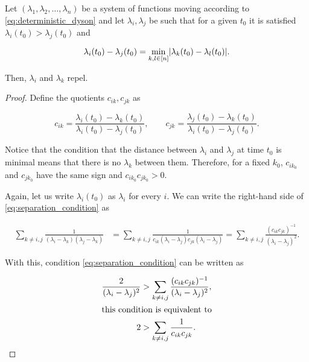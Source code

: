\begin{theorem} \label{thm:hermite_minimal_grows}
    Let $(\lambda_1, \lambda_2, \dots, \lambda_n)$ be a system of functions moving according to \eqref{eq:deterministic_dyson} and let $\lambda_i,\lambda_j$ be such that for a given $t_0$ it is satisfied $\lambda_i(t_0) > \lambda_j(t_0)$ and 
    
    \begin{equation*}
        \lambda_i(t_0) - \lambda_j(t_0) = \min_{k,l \in [n]} \lvert  \lambda_k(t_0) - \lambda_l(t_0) \rvert.
    \end{equation*}

    Then, $\lambda_i$ and $\lambda_k$ repel. 
\end{theorem}

\begin{proof}
    Define the quotients $c_{ik}, c_{jk}$ as 

    \begin{equation*}
        c_{ik} = \frac{\lambda_i(t_0) - \lambda_k(t_0)}{\lambda_i(t_0) - \lambda_j(t_0)}, \qquad c_{jk} = \frac{\lambda_j(t_0) - \lambda_k(t_0)}{\lambda_i(t_0) - \lambda_j(t_0)}.
    \end{equation*}

    Notice that the condition that the distance between $\lambda_i$ and $\lambda_j$ at time $t_0$ is minimal means that there is no $\lambda_k$ between them. Therefore, for a fixed $k_0$, $c_{ik_0}$ and $c_{jk_0}$ have the same sign and $c_{ik_0}c_{jk_0}>0$. 
    
    Again, let us write $\lambda_i(t_0)$ as $\lambda_i$ for every $i$. We can write the right-hand side of \eqref{eq:separation_condition} as

    \begin{align*}
        \sum_{k\neq i,j} \frac{1}{(\lambda_i - \lambda_k)(\lambda_j - \lambda_k)} &= \sum_{k\neq i,j} \frac{1}{ c_{ik}(\lambda_i - \lambda_j) c_{jk}(\lambda_i - \lambda_j)} = \sum_{k\neq i,j} \frac{ (c_{ik}c_{jk})^{-1} }{(\lambda_i-\lambda_j)^2}.
    \end{align*}

    With this, condition \eqref{eq:separation_condition} can be written as

    \begin{align}
        \frac{2}{(\lambda_i - \lambda_j)^2} &> \sum_{k\neq i,j} \frac{ (c_{ik}c_{jk})^{-1} }{(\lambda_i-\lambda_j)^2},\notag\\
        \intertext{this condition is equivalent to}
        2 &> \sum_{k\neq i,j} \frac{1}{c_{ik}c_{jk}}. \label{eq:simplified_condition}
    \end{align}


\end{proof}
